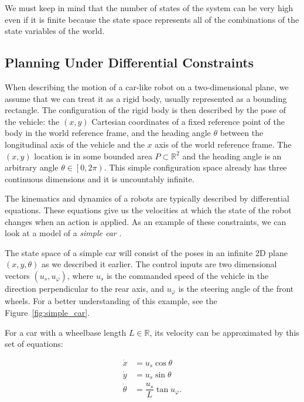 We must keep in mind that the number of states of the system can be very high even if it is finite because the state space represents all of the combinations of the state variables of the world.

\subsection{Planning Under Differential Constraints}
\label{sec:planning_under_differential_constraints}

When describing the motion of a car-like robot on a two-dimensional plane, we assume that we can treat it as a rigid body, usually represented as a bounding rectangle. The configuration of the rigid body is then described by the pose of the vehicle: the $\left(x,y\right)$ Cartesian coordinates of a fixed reference point of the body in the world reference frame, and the heading angle $\theta$ between the longitudinal axis of the vehicle and the $x$ axis of the world reference frame. The $(x, y)$ location is in some bounded area $P\subset\mathbb{R}^2$ and the heading angle is an arbitrary angle $\theta\in\left[0,2\pi\right)$. This simple configuration space already has three continuous dimensions and it is uncountably infinite.

The kinematics and dynamics of a robots are typically described by differential equations. These equations give us the velocities at which the state of the robot changes when an action is applied. As an example of these constraints, we can look at a model of a \textit{simple car} \cite[Section~13.1.2.1]{lavalle_2006}.

\begin{example}
The state space of a simple car will consist of the poses in an infinite 2D plane $(x, y, \theta)$ as we described it earlier. The control inputs are two dimensional vectors $\left(u_s, u_\varphi\right)$, where $u_s$ is the commanded speed of the vehicle in the direction perpendicular to the rear axis, and $u_\varphi$ is the steering angle of the front wheels. For a better understanding of this example, see the Figure~\ref{fig:simple_car}.

For a car with a wheelbase length $L\in\mathbb{R}$, its velocity can be approximated by this set of equations:

\begin{equation}
\begin{aligned}
	\dot{x}&=u_s \cos \theta \\
	\dot{y}&=u_s \sin \theta \\
	\dot{\theta}&=\dfrac{u_s}{L} \tan u_\varphi.
\end{aligned}
\end{equation}
\end{example}

